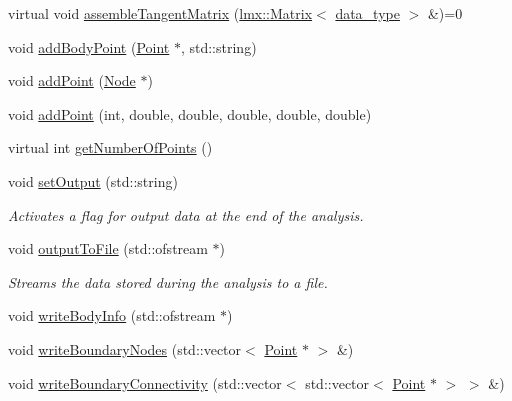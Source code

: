\begin{DoxyCompactItemize}
\item 
virtual void \hyperlink{classmknix_1_1_flex_body_af661699307694d1dd08b892132416ad7}{assemble\+Tangent\+Matrix} (\hyperlink{classlmx_1_1_matrix}{lmx\+::\+Matrix}$<$ \hyperlink{namespacemknix_a16be4b246fbf2cceb141e3a179111020}{data\+\_\+type} $>$ \&)=0
\item 
void \hyperlink{classmknix_1_1_flex_body_afcf840a2150f3cdcbeaff2370e37fb05}{add\+Body\+Point} (\hyperlink{classmknix_1_1_point}{Point} $\ast$, std\+::string)
\item 
void \hyperlink{classmknix_1_1_flex_body_ab45a6a50dcb5323184e777173ff93bd6}{add\+Point} (\hyperlink{classmknix_1_1_node}{Node} $\ast$)
\item 
void \hyperlink{classmknix_1_1_flex_body_a3819e507043e7173b307e0a8c4d71f4d}{add\+Point} (int, double, double, double, double, double)
\item 
virtual int \hyperlink{classmknix_1_1_flex_body_af80e45d5e9bb183ff108e8e641990949}{get\+Number\+Of\+Points} ()
\item 
void \hyperlink{classmknix_1_1_flex_body_ab863f9c782ccffbcea5c5e485fff52bc}{set\+Output} (std\+::string)
\begin{DoxyCompactList}\small\item\em Activates a flag for output data at the end of the analysis. \end{DoxyCompactList}\item 
void \hyperlink{classmknix_1_1_flex_body_a1cf57f024248bbb196e91aac9b9ab9fe}{output\+To\+File} (std\+::ofstream $\ast$)
\begin{DoxyCompactList}\small\item\em Streams the data stored during the analysis to a file. \end{DoxyCompactList}\item 
void \hyperlink{classmknix_1_1_flex_body_a504be54b6f3009687ed85d17d5ade510}{write\+Body\+Info} (std\+::ofstream $\ast$)
\item 
void \hyperlink{classmknix_1_1_flex_body_af17d65a1eba1f2de409ce43d88904751}{write\+Boundary\+Nodes} (std\+::vector$<$ \hyperlink{classmknix_1_1_point}{Point} $\ast$ $>$ \&)
\item 
void \hyperlink{classmknix_1_1_flex_body_a258ec4de12c53390875e731cace33219}{write\+Boundary\+Connectivity} (std\+::vector$<$ std\+::vector$<$ \hyperlink{classmknix_1_1_point}{Point} $\ast$ $>$ $>$ \&)
\end{DoxyCompactItemize}
